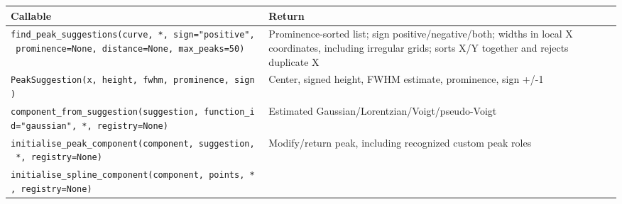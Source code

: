 \documentclass[
  10pt,
  a4paper,
  oneside]{scrreprt}
\begin{document}
\begin{longtable}[]{@{}ll@{}}
\toprule
\begin{minipage}[b]{0.47\columnwidth}\raggedright
Callable\strut
\end{minipage} & \begin{minipage}[b]{0.47\columnwidth}\raggedright
Return\strut
\end{minipage}\tabularnewline
\midrule
\endhead
\begin{minipage}[t]{0.47\columnwidth}\raggedright
\texttt{find\_peak\_suggestions(curve,\ *,\ sign="positive",\ prominence=None,\ distance=None,\ max\_peaks=50)}\strut
\end{minipage} & \begin{minipage}[t]{0.47\columnwidth}\raggedright
Prominence-sorted list; sign positive/negative/both; widths in local X
coordinates, including irregular grids; sorts X/Y together and rejects
duplicate X\strut
\end{minipage}\tabularnewline
\begin{minipage}[t]{0.47\columnwidth}\raggedright
\texttt{PeakSuggestion(x,\ height,\ fwhm,\ prominence,\ sign)}\strut
\end{minipage} & \begin{minipage}[t]{0.47\columnwidth}\raggedright
Center, signed height, FWHM estimate, prominence, sign +/-1\strut
\end{minipage}\tabularnewline
\begin{minipage}[t]{0.47\columnwidth}\raggedright
\texttt{component\_from\_suggestion(suggestion,\ function\_id="gaussian",\ *,\ registry=None)}\strut
\end{minipage} & \begin{minipage}[t]{0.47\columnwidth}\raggedright
Estimated Gaussian/Lorentzian/Voigt/pseudo-Voigt\strut
\end{minipage}\tabularnewline
\begin{minipage}[t]{0.47\columnwidth}\raggedright
\texttt{initialise\_peak\_component(component,\ suggestion,\ *,\ registry=None)}\strut
\end{minipage} & \begin{minipage}[t]{0.47\columnwidth}\raggedright
Modify/return peak, including recognized custom peak roles\strut
\end{minipage}\tabularnewline
\begin{minipage}[t]{0.47\columnwidth}\raggedright
\texttt{initialise\_spline\_component(component,\ points,\ *,\ registry=None)}\strut
\end{minipage} & \begin{minipage}[t]{0.47\columnwidth}\raggedright

\end{minipage}
\end{longtable}
\end{document}
